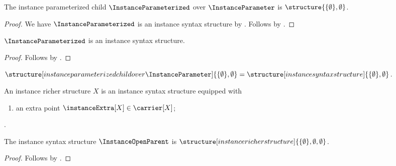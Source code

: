 \begin{instance}\label{instance_parameterized_object}
    The instance parameterized child $\InstanceParameterized$ over
    $\InstanceParameter$ is
    $\structure{\{\emptyset\},\emptyset}$.
\end{instance}
\begin{proof}
    We have $\InstanceParameterized$ is an instance syntax structure by
    .
    Follows by
    .
\end{proof}

\begin{proposition}\label{instance_parameterized_parent_available}
    $\InstanceParameterized$ is an instance syntax structure.
\end{proposition}
\begin{proof}
    Follows by
    .
\end{proof}

\begin{proposition}\label{instance_parameter_is_not_stored}
    $\structure[instance parameterized child over \InstanceParameter]
        {\{\emptyset\},\emptyset}
    =\structure[instance syntax structure]
        {\{\emptyset\},\emptyset}$.
\end{proposition}

\begin{struct}\label{instance_richer_structure}
    An instance richer structure $X$ is an instance syntax structure equipped
    with
    \begin{enumerate}
        \item\label{instance_richer_extra}
            an extra point $\instanceExtra[X]\in\carrier[X]$;
    \end{enumerate}
    .
\end{struct}

\begin{instance}\label{instance_open_parent_object}
    The instance syntax structure $\InstanceOpenParent$ is
    $\structure[instance richer structure]
        {\{\emptyset\},\emptyset,\emptyset}$.
\end{instance}
\begin{proof}
    Follows by
    .
\end{proof}

